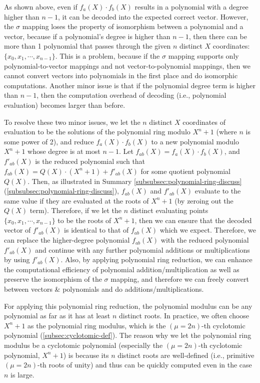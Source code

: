 As shown above, even if $f_a(X) \cdot f_b(X)$ results in a polynomial with a degree higher than $n-1$, it can be decoded into the expected correct vector. However, the $\sigma$ mapping loses the property of isomorphism between a polynomial and a vector, because if a polynomial's degree is higher than $n-1$, then there can be more than 1 polynomial that passes through the given $n$ distinct $X$ coordinates: $\{x_0, x_1, \cdots, x_{n-1}\}$. This is a problem, because if the $\sigma$ mapping supports only polynomial-to-vector mappings and not vector-to-polynomial mappings, then we cannot convert vectors into polynomials in the first place and do isomorphic computations. Another minor issue is that if the polynomial degree term is higher than $n-1$, then the computation overhead of decoding (i.e., polynomial evaluation) becomes larger than before. 

To resolve these two minor issues, we let the $n$ distinct $X$ coordinates of evaluation to be the solutions of the polynomial ring modulo $X^n + 1$ (where $n$ is some power of 2), and reduce $f_a(X) \cdot f_b(X)$ to a new polynomial modulo $X^n + 1$ whose degree is at most $n - 1$. Let $f_{ab}(X) = f_a(X) \cdot f_b(X)$, and $f'_{ab}(X)$ is the reduced polynomial such that $f_{ab}(X) = Q(X)\cdot (X^n + 1) + f'_{ab}(X)$ for some quotient polynomial $Q(X)$. Then, as illustrated in Summary \ref*{subsubsec:polynomial-ring-discuss} (\autoref{subsubsec:polynomial-ring-discuss}), $f_{ab}(X)$ and $f'_{ab}(X)$ evaluate to the same value if they are evaluated at the roots of $X^n + 1$ (by zeroing out the $Q(X)$ term). Therefore, if we let the $n$ distinct evaluating points $\{x_0, x_1, \cdots, x_{n-1}\}$ to be the roots of $X^n + 1$, then we can ensure that the decoded vector of $f'_{ab}(X)$ is identical to that of $f_{ab}(X)$ which we expect. Therefore, we can replace the higher-degree polynomial $f_{ab}(X)$ with the reduced polynomial $f'_{ab}(X)$ and continue with any further polynomial additions or multiplications by using $f'_{ab}(X)$. Also, by applying polynomial ring reduction, we can enhance the computational efficiency of polynomial addition/multiplication as well as preserve the isomorphism of the $\sigma$ mapping, and therefore we can freely convert between vectors \& polynomials and do additions/multiplications. 

For applying this polynomial ring reduction, the polynomial modulus can be any polynomial as far as it has at least $n$ distinct roots. In practice, we often choose $X^n + 1$ as the polynomial ring modulus, which is the $(\mu=2n)$-th cyclotomic polynomial (\autoref{subsec:cyclotomic-def}). The reason why we let the polynomial ring modulus be a cyclotomic polynomial (especially the $(\mu=2n)$-th cyclotomic polynomial, $X^n + 1$) is because its $n$ distinct roots are well-defined (i.e., primitive $(\mu=2n)$-th roots of unity) and thus can be quickly computed even in the case $n$ is large.

